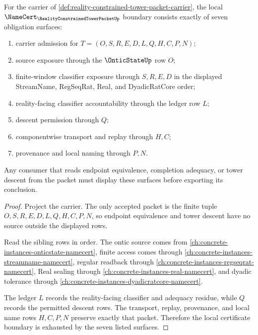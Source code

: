 \begin{theorem}
\label{thm:reality-constrained-tower-packet-namecert-boundary}
For the carrier of \autoref{def:reality-constrained-tower-packet-carrier}, the local $\NameCert_{\RealityConstrainedTowerPacketUp}$ boundary consists exactly of seven obligation surfaces:
\begin{enumerate}
\item carrier admission for $T=(O,S,R,E,D,L,Q,H,C,P,N)$;
\item source exposure through the $\OnticStateUp$ row $O$;
\item finite-window classifier exposure through $S,R,E,D$ in the displayed StreamName, RegSeqRat, Real, and DyadicRatCore order;
\item reality-facing classifier accountability through the ledger row $L$;
\item descent permission through $Q$;
\item componentwise transport and replay through $H,C$;
\item provenance and local naming through $P,N$.
\end{enumerate}
Any consumer that reads endpoint equivalence, completion adequacy, or tower descent from the packet must display these surfaces before exporting its conclusion.
\end{theorem}
\begin{proof}
Project the carrier. The only accepted packet is the finite tuple $O,S,R,E,D,L,Q,H,C,P,N$, so endpoint equivalence and tower descent have no source outside the displayed rows.

Read the sibling rows in order. The ontic source comes from \autoref{ch:concrete-instances-onticstate-namecert}, finite access comes through \autoref{ch:concrete-instances-streamname-namecert}, regular readback through \autoref{ch:concrete-instances-regseqrat-namecert}, Real sealing through \autoref{ch:concrete-instances-real-namecert}, and dyadic tolerance through \autoref{ch:concrete-instances-dyadicratcore-namecert}.

The ledger $L$ records the reality-facing classifier and adequacy residue, while $Q$ records the permitted descent rows. The transport, replay, provenance, and local name rows $H,C,P,N$ preserve exactly that packet. Therefore the local certificate boundary is exhausted by the seven listed surfaces.
\end{proof}

